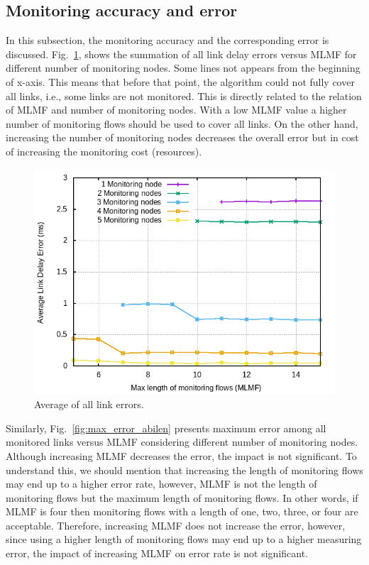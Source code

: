 \documentclass[10pt, journal, letterpaper]{IEEEtran}
\begin{document}
\subsection{Monitoring accuracy and error}\label{subsec:eval_accuracy_and_error}
In this subsection, the monitoring accuracy and the corresponding error is discussed. Fig.~\ref{fig:sum_delay_abilene}, shows the summation of all link delay errors versus MLMF for different number of monitoring nodes. Some lines not appears from the beginning of x-axis. This means that before that point, the algorithm could not fully cover all links, i.e., some links are not monitored. This is directly related to the relation of MLMF and number of monitoring nodes. With a low MLMF value a higher number of monitoring flows should be used to cover all links. On the other hand, increasing the number of monitoring nodes decreases the overall error but in cost of increasing the monitoring cost (resources).
\begin{figure}
    \centering
    \includegraphics[width=.8\columnwidth]{img/eval_Abilene_Max_Length_of_Summation_of_All_Links_Error.png}
    \caption{Average of all link errors.}
    \label{fig:sum_delay_abilene}
\end{figure}
Similarly, Fig.~\ref{fig:max_error_abilen} presents maximum error among all monitored links versus MLMF considering different number of monitoring nodes. Although increasing MLMF decreases the error, the impact is not significant. To understand this, we should mention that increasing the length of monitoring flows may end up to a higher error rate, however, MLMF is not the length of monitoring flows but the maximum length of monitoring flows. In other words, if MLMF is four then monitoring flows with a length of one, two, three, or four are acceptable. Therefore, increasing MLMF does not increase the error, however, since using a higher length of monitoring flows may end up to a higher measuring error, the impact of increasing MLMF on error rate is not significant.
\end{document}
